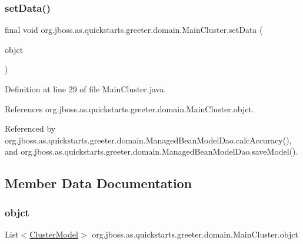 \subsubsection{\texorpdfstring{set\+Data()}{setData()}}
{\footnotesize\ttfamily final void org.\+jboss.\+as.\+quickstarts.\+greeter.\+domain.\+Main\+Cluster.\+set\+Data (\begin{DoxyParamCaption}\item[{List$<$ \hyperlink{classorg_1_1jboss_1_1as_1_1quickstarts_1_1greeter_1_1domain_1_1_cluster_model}{Cluster\+Model} $>$}]{objct }\end{DoxyParamCaption})}



Definition at line 29 of file Main\+Cluster.\+java.



References org.\+jboss.\+as.\+quickstarts.\+greeter.\+domain.\+Main\+Cluster.\+objct.



Referenced by org.\+jboss.\+as.\+quickstarts.\+greeter.\+domain.\+Managed\+Bean\+Model\+Dao.\+calc\+Accuracy(), and org.\+jboss.\+as.\+quickstarts.\+greeter.\+domain.\+Managed\+Bean\+Model\+Dao.\+save\+Model().



\subsection{Member Data Documentation}
\mbox{\label{classorg_1_1jboss_1_1as_1_1quickstarts_1_1greeter_1_1domain_1_1_main_cluster_a4c502c63f5bf73b0e514bf9f302844ff}} 
\subsubsection{\texorpdfstring{objct}{objct}}
{\footnotesize\ttfamily List$<$\hyperlink{classorg_1_1jboss_1_1as_1_1quickstarts_1_1greeter_1_1domain_1_1_cluster_model}{Cluster\+Model}$>$ org.\+jboss.\+as.\+quickstarts.\+greeter.\+domain.\+Main\+Cluster.\+objct\hspace{0.3cm}{\ttfamily [private]}}



